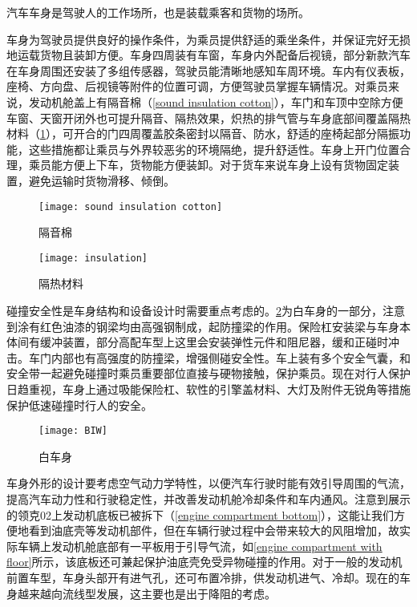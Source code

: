 \documentclass[UTF8]{ctexart}
\numberwithin{figure}{section}
\numberwithin{table}{section}
\begin{document}
汽车车身是驾驶人的工作场所，也是装载乘客和货物的场所。

车身为驾驶员提供良好的操作条件，为乘员提供舒适的乘坐条件，并保证完好无损地运载货物且装卸方便。车身四周装有车窗，车身内外配备后视镜，部分新款汽车在车身周围还安装了多组传感器，驾驶员能清晰地感知车周环境。车内有仪表板，座椅、方向盘、后视镜等附件的位置可调，方便驾驶员掌握车辆情况。对乘员来说，发动机舱盖上有隔音棉（\cref{sound insulation cotton}），车门和车顶中空除方便车窗、天窗开闭外也可提升隔音、隔热效果，炽热的排气管与车身底部间覆盖隔热材料（\cref{insulation}），可开合的门四周覆盖胶条密封以隔音、防水，舒适的座椅起部分隔振功能，这些措施都让乘员与外界较恶劣的环境隔绝，提升舒适性。车身上开门位置合理，乘员能方便上下车，货物能方便装卸。对于货车来说车身上设有货物固定装置，避免运输时货物滑移、倾倒。

\begin{figure}[htbp]
	\centering
	\begin{minipage}[b]{0.7\textwidth}
		\centering
		\texttt{[image: sound insulation cotton]}
		\caption{隔音棉}
		\label{sound insulation cotton}
	\end{minipage}
	\begin{minipage}[b]{0.25\textwidth}
		\centering
		\texttt{[image: insulation]}
		\caption{隔热材料}
		\label{insulation}
	\end{minipage}
\end{figure}

碰撞安全性是车身结构和设备设计时需要重点考虑的。\cref{BIW}为白车身的一部分，注意到涂有红色油漆的钢梁均由高强钢制成，起防撞梁的作用。保险杠安装梁与车身本体间有缓冲装置，部分高配车型上这里会安装弹性元件和阻尼器，缓和正碰时冲击。车门内部也有高强度的防撞梁，增强侧碰安全性。车上装有多个安全气囊，和安全带一起避免碰撞时乘员重要部位直接与硬物接触，保护乘员。现在对行人保护日趋重视，车身上通过吸能保险杠、软性的引擎盖材料、大灯及附件无锐角等措施保护低速碰撞时行人的安全。

\begin{figure}[htbp]
	\centering
	\begin{minipage}[b]{0.6\textwidth}
		\centering
		\texttt{[image: BIW]}
		\caption{白车身}
		\label{BIW}
	\end{minipage}
\end{figure}

车身外形的设计要考虑空气动力学特性，以便汽车行驶时能有效引导周围的气流，提高汽车动力性和行驶稳定性，并改善发动机舱冷却条件和车内通风。注意到展示的领克02上发动机底板已被拆下（\cref{engine compartment bottom}），这能让我们方便地看到油底壳等发动机部件，但在车辆行驶过程中会带来较大的风阻增加，故实际车辆上发动机舱底部有一平板用于引导气流，如\cref{engine compartment with floor}所示，该底板还可兼起保护油底壳免受异物碰撞的作用。对于一般的发动机前置车型，车身头部开有进气孔，还可布置冷排，供发动机进气、冷却。现在的车身越来越向流线型发展，这主要也是出于降阻的考虑。
\end{document}
